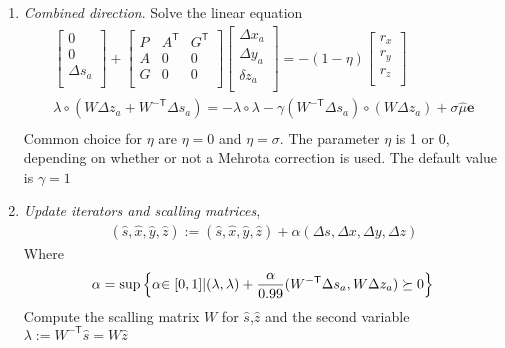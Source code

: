\begin{enumerate}
    \item \textit{Combined direction}. Solve the linear equation\\
    	\begin{equation}
    		\begin{aligned}
    			\begin{bmatrix}
    				0\\
    				0\\
    				\Delta s_a\\
    			\end{bmatrix}
    			+
    			\begin{bmatrix}
        			P & A^\mathsf{T} & G^\mathsf{T}\\
        			A & 0 & 0\\
        			G & 0 & 0\\
    			\end{bmatrix}
    			\begin{bmatrix}
    				\Delta x_a\\
    				\Delta y_a\\
    				\delta z_a\\
    			\end{bmatrix}
    			=-(1-\eta)
    			\begin{bmatrix}
    				r_x\\
    				r_y\\
    				r_z\\
    			\end{bmatrix}\\
    			\lambda\circ(W\Delta {z_a} +W^{-\mathsf{T}}\Delta s_a ) = -\lambda \circ \lambda - \gamma(W^\mathsf{-T}\Delta s_a )\circ(W\Delta z_a)+\sigma\hat\mu\textbf{e}\\
    		\end{aligned}
    		\label{eqn:cvxopt_algorithm_3}
    	\end{equation}
    	Common choice for $\eta$ are $\eta=0$ and $\eta=\sigma$. The parameter $\eta$ is 1 or 0, depending on whether or not a Mehrota correction is used. The default value is $\gamma=1$
    \item \textit{Update iterators and scalling matrices},
    	\begin{equation*}
    		\begin{aligned}
    			(\hat s,\hat x,\hat y,\hat z):=(\hat s,\hat x,\hat y,\hat z)+\alpha(\Delta s,\Delta x,\Delta y,\Delta z)
    		\end{aligned}
    	\end{equation*}
    Where
    \begin{equation*}
    	\alpha = \textrm{sup} \left\{ {\alpha} {\in[0,1] } | (\lambda,\lambda)+\frac{\alpha}{0.99} ( W^{-\mathsf{T}} \Delta s_a, W\Delta z_a)\succeq 0\right\}\\
    \end{equation*}
    Compute the scalling matrix $W$ for $\hat s$,$\hat z$ and the second variable $\lambda :=W^\mathsf{-T}\hat s = W\hat z $  
\end{enumerate}
